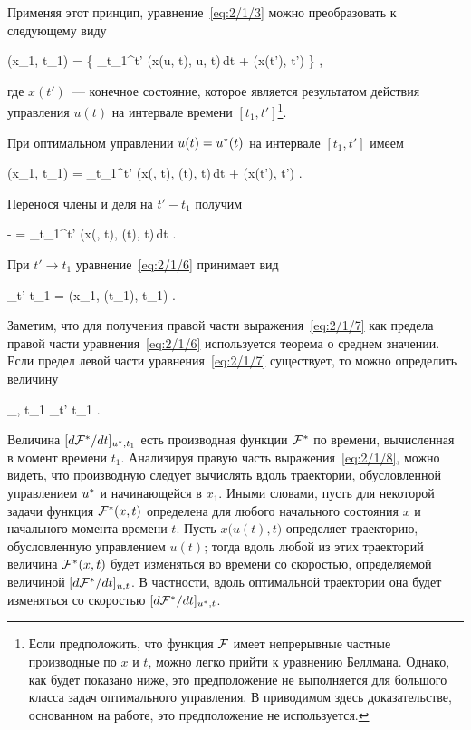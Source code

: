 Применяя этот принцип, уравнение~\ref{eq:2/1/3} можно преобразовать к следующему виду

    \optF(x_1, t_1) =  \biggl\{ \int\limits_{t_1}^{t'} \funcL\bigl(x(u, t), u, t\bigr)\,dt + \optF\bigl(x(t'), t'\bigr) \biggr\} \mbox{,}
\eeq

где $x(t')$~--- конечное состояние, которое является результатом действия управления $u(t)$ на интервале времени $[t_1, t']$\footnote{ Если предположить, что функция $\mathcal{F}$ имеет непрерывные частные производные по $x$ и $t$, можно легко прийти к уравнению Беллмана\cite{BELLMAN1}. Однако, как будет показано ниже, это предположение не выполняется для большого класса задач оптимального управления. В приводимом здесь доказательстве, основанном на работе\cite{TCHAMRAN}, это предположение не используется. }.

При оптимальном управлении $u(t) = u^{*}(t)$ на интервале $[t_1, t']$ имеем

    \optF(x_1, t_1) = \int\limits_{t_1}^{t'} \funcL\bigl(x(\optU, t), \optU(t), t\bigr)\,dt + \optF\bigl(x(t'), t'\bigr) \mbox{.}
\eeq

Перенося члены и деля на $t' - t_1$ получим

    - =  \int\limits_{t_1}^{t'} \funcL\bigl(x(\optU, t), \optU(t), t\bigr)\,dt \mbox{.}
\eeq

При $t' \to t_1$ уравнение~\ref{eq:2/1/6} принимает вид

    \lim_{t' \to t_1}  = \funcL\bigl(x_1, \optU(t_1), t_1\bigr) \mbox{.}
\eeq

Заметим, что для получения правой части выражения~\ref{eq:2/1/7} как предела правой части уравнения~\ref{eq:2/1/6} используется теорема о среднем значении\cite{FICHTENGOLZ}. Если предел левой части уравнения~\ref{eq:2/1/7} существует, то можно определить величину

    _{\optU, t_1} \eqdef \lim_{t' \to t_1}  \mbox{.}
\eeq

Величина $[ d \mathcal{F}^{*} / d t ]_{u^{*}, t_1}$ есть производная функции $\mathcal{F}^{*}$ по времени, вычисленная в момент времени $t_1$. Анализируя правую часть выражения~\ref{eq:2/1/8}, можно видеть, что производную следует вычислять вдоль траектории, обусловленной управлением $u^{*}$ и начинающейся в $x_1$. Иными словами, пусть для некоторой задачи функция $\mathcal{F}^{*}(x, t)$ определена для любого начального состояния $x$ и начального момента времени $t$. Пусть $x\bigl( u(t), t \bigr)$ определяет траекторию, обусловленную управлением $u(t)$; тогда вдоль любой из этих траекторий величина $\mathcal{F}^{*}(x, t)$ будет изменяться во времени со скоростью, определяемой величиной $[ d \mathcal{F}^{*} / d t ]_{u, t}$. В частности, вдоль оптимальной траектории она будет изменяться со скоростью $[ d \mathcal{F}^{*} / d t ]_{u^{*}, t}$.

